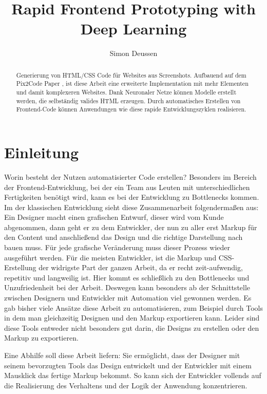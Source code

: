 \documentclass[pdftex,a4paper,halfparskip, article]{scrartcl}
\title{Rapid Frontend Prototyping with Deep Learning} %
\author{Simon Deussen}	%
\begin{document}
\maketitle	

\begin{abstract}
Generierung von HTML/CSS Code für Websites aus Screenshots. Aufbauend auf dem Pix2Code Paper \cite{Beltramelli17}, ist diese Arbeit eine erweiterte Implementation mit mehr Elementen und damit komplexeren Websites. Dank Neuronaler Netze können Modelle erstellt werden, die selbständig valides HTML erzeugen. Durch automatisches Erstellen von Frontend-Code können Anwendungen wie diese rapide Entwicklungszyklen realisieren. 
\end{abstract}


\tableofcontents	%
\section{Einleitung} 

Worin besteht der Nutzen automatisierter Code erstellen? Besonders im Bereich der Frontend-Entwicklung, bei der ein Team aus Leuten mit unterschiedlichen Fertigkeiten benötigt wird, kann es bei der Entwicklung zu Bottlenecks kommen. Im der klassischen Entwicklung sieht diese Zusammenarbeit folgendermaßen aus: \\
Ein Designer macht einen grafischen Entwurf, dieser wird vom Kunde abgenommen, dann geht er zu dem Entwickler, der nun zu aller erst Markup für den Content und anschließend das Design und die richtige Darstellung nach bauen muss. Für jede grafische Veränderung muss dieser Prozess wieder ausgeführt werden. Für die meisten Entwickler, ist die Markup und CSS-Erstellung der widrigste Part der ganzen Arbeit, da er recht zeit-aufwendig, repetitiv und langweilig ist.
Hier kommt es schließlich zu den Bottlenecks und Unzufriedenheit bei der Arbeit. Deswegen kann besonders ab der Schnittstelle zwischen Designern und Entwickler mit Automation viel gewonnen werden. Es gab bisher viele Ansätze diese Arbeit zu automatisieren, zum Beispiel durch Tools in dem man gleichzeitig Designen und den Markup exportieren kann. Leider sind diese Tools entweder nicht besonders gut darin, die Designs zu erstellen oder den Markup zu exportieren.

Eine Abhilfe soll diese Arbeit liefern: Sie ermöglicht, dass der Designer mit seinem bevorzugten Tools das Design entwickelt und der Entwickler mit einem Mausklick das fertige Markup bekommt. So kann sich der Entwickler vollends auf die Realisierung des Verhaltens und der Logik der Anwendung konzentrieren. 
\end{document}
